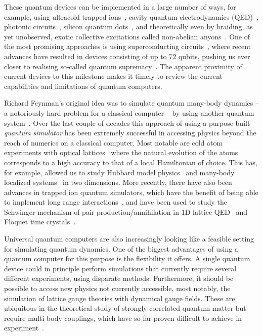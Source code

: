 \documentclass[twocolumn,showpacs,preprintnumbers,nofootinbib,amsmath,aps,pra,longbibliography,amssymb,superscriptaddress]{revtex4-1}
\begin{document}
These quantum devices can be implemented in a large number of ways, for example, using ultracold trapped ions~\cite{Cirac1995,Martinez2016,Nam2019,Wright2019,Bruzewicz2019,Figgatt2018}, cavity quantum electrodynamics (QED)~\cite{Houck2012,Barends2014,Blais2007,Zhu2017}, photonic circuits~\cite{Aspuru2012,Sun2018,Tambasco2018}, silicon quantum dots~\cite{Kane1998,West2019,Yang2019}, and theoretically even by braiding, as yet unobserved, exotic collective excitations called non-abelian anyons~\cite{Nayak2008,Sarma2006,Lahtinen2017}. One of the most promising approaches is using superconducting circuits~\cite{Nakamura1999,Wendin2017,Krantz2019}, where recent advances have resulted in devices consisting of up to 72 qubits, pushing us ever closer to realising so-called quantum supremacy~\cite{Boixo2018}. The apparent proximity of current devices to this milestone makes it timely to review the current capabilities and limitations of quantum computers.

Richard Feynman's original idea was to simulate quantum many-body dynamics -- a notoriously hard problem for a classical computer -- by using another quantum system~\cite{Feynman1982}. Over the last couple of decades this approach of using a purpose built \emph{quantum simulator} has been extremely successful in accessing physics beyond the reach of numerics on a classical computer. Most notable are cold atom experiments with optical lattices~\cite{Bloch2008,Bakr2009,Schreiber2015,Choi2016,Bordia2017,Mitra2017,Cooper2018} where the natural evolution of the atoms corresponds to a high accuracy to that of a local Hamiltonian of choice. This has, for example, allowed us to study Hubbard model physics~\cite{Bakr2009,Mitra2017} and many-body localized systems~\cite{Choi2016,Schreiber2015,Bordia2017} in two dimensions. More recently, there have also been advances in trapped ion quantum simulators, which have the benefit of being able to implement long range interactions~\cite{Cirac1995,Martinez2016,Garttner2017}, and have been used to study the Schwinger-mechanism of pair production/annihilation in 1D lattice QED~\cite{Martinez2016} and Floquet time crystals~\cite{Zhang2017}.

Universal quantum computers are also increasingly looking like a feasible setting for simulating quantum dynamics. One of the biggest advantages of using a quantum computer for this purpose is the flexibility it offers. A single quantum device could in principle perform simulations that currently require several different experiments, using disparate methods. Furthermore, it should be possible to access new physics not currently accessible, most notably, the simulation of lattice gauge theories with dynamical gauge fields. These are ubiquitous in the theoretical study of strongly-correlated quantum matter but require multi-body couplings, which have so far proven difficult to achieve in experiment~\cite{Wiese2013,Zohar2016}.
\end{document}

